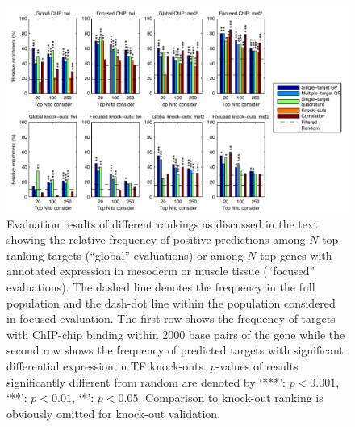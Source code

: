 \documentclass{pnastwo}
\begin{document}
\begin{article}
\begin{figure}[tb]
  \centering
  \includegraphics{fig3}
  \caption{Evaluation results of different rankings as
    discussed in the text showing the relative frequency of positive
    predictions among $N$ top-ranking targets (``global'' evaluations)
    or among $N$ top genes
    with annotated expression in mesoderm or muscle tissue
    (``focused'' evaluations).
    The dashed line
    denotes the frequency in the full population and the dash-dot
    line within the population considered in focused evaluation.
    The first row shows the frequency of targets with ChIP-chip
    binding within 2000 base pairs of the gene
    while the second row shows the frequency of
    predicted targets with significant differential
    expression in TF knock-outs.
    $p$-values of results significantly different from random are
    denoted by `***': $p <
    0.001$, `**': $p < 0.01$, `*': $p < 0.05$.
    Comparison to knock-out ranking is obviously omitted for knock-out
    validation. \label{fig:dros_global_evaluation}
  }
\end{figure}


\end{article}
\end{document}
